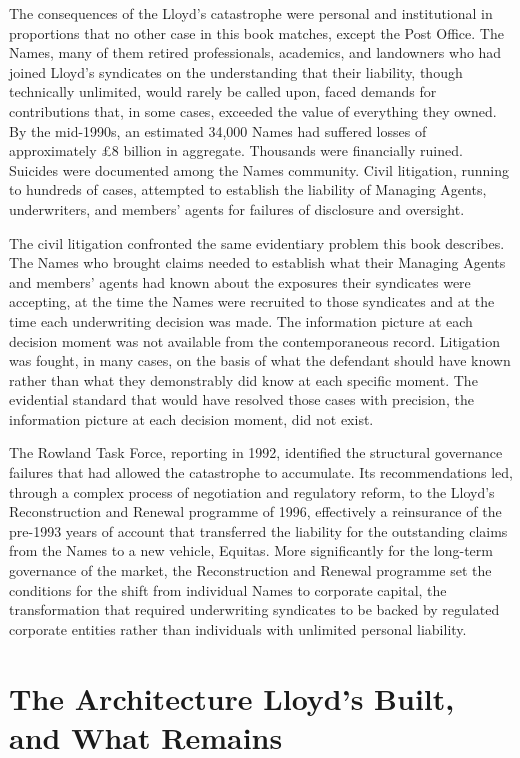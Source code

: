 The consequences of the Lloyd's catastrophe were personal and institutional in proportions that no other case in this book matches, except the Post Office. The Names, many of them retired professionals, academics, and landowners who had joined Lloyd's syndicates on the understanding that their liability, though technically unlimited, would rarely be called upon, faced demands for contributions that, in some cases, exceeded the value of everything they owned. By the mid-1990s, an estimated 34,000 Names had suffered losses of approximately £8 billion in aggregate. Thousands were financially ruined. Suicides were documented among the Names community. Civil litigation, running to hundreds of cases, attempted to establish the liability of Managing Agents, underwriters, and members' agents for failures of disclosure and oversight.

The civil litigation confronted the same evidentiary problem this book describes. The Names who brought claims needed to establish what their Managing Agents and members' agents had known about the exposures their syndicates were accepting, at the time the Names were recruited to those syndicates and at the time each underwriting decision was made. The information picture at each decision moment was not available from the contemporaneous record. Litigation was fought, in many cases, on the basis of what the defendant should have known rather than what they demonstrably did know at each specific moment. The evidential standard that would have resolved those cases with precision, the information picture at each decision moment, did not exist.

The Rowland Task Force, reporting in 1992, identified the structural governance failures that had allowed the catastrophe to accumulate. Its recommendations led, through a complex process of negotiation and regulatory reform, to the Lloyd's Reconstruction and Renewal programme of 1996, effectively a reinsurance of the pre-1993 years of account that transferred the liability for the outstanding claims from the Names to a new vehicle, Equitas. More significantly for the long-term governance of the market, the Reconstruction and Renewal programme set the conditions for the shift from individual Names to corporate capital, the transformation that required underwriting syndicates to be backed by regulated corporate entities rather than individuals with unlimited personal liability.

\scenebreak

\section{The Architecture Lloyd's Built, and What Remains}

